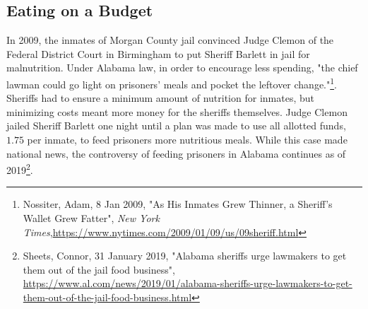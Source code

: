 \begin{comment}
Since acres are in thousands, divide the constraints of timber and animal grazing by 1000 in the problem setup, and compensate for this after obtaining a solution.

The problem can be written as follows:
\begin{align*}
\text{maximize } &\sum\limits_{i=1}^7 \sum\limits_{j=1}^3 p_{i,j}x_{i,j} \\
\text{subject to } &\sum\limits_{j=1}^3 x_{i,j} = s_i  \text{ for } i=1,..,7 \\
	        &\sum\limits_{i=1}^7 \sum\limits_{j=1}^3 t_{i,j}x_{i,j} \geq 40,000 \\
		&\sum\limits_{i=1}^7 \sum\limits_{j=1}^3 g_{i,j}x_{i,j} \geq 5 \\
		&\frac{1}{788} \sum\limits_{i=1}^7 \sum\limits_{j=1}^3 w_{i,j}x_{i,j} \geq 70 \\
		&x_{i,j} \geq 0 \text{ for } i=1,...,7  \text{ and } j=1,2,3
\end{align*}

\begin{problem}
Solve the allocation problem above.
Return the minimizing allocation vector of $x_{i,j}$'s and the maximum total net present value.
Remember to consider the following:
\begin{enumerate}
\item The allocation vector should be a (21,1) NumPy array.
\item Recall that the constraints of timber and animal grazing were divided by 1000.
To compensate, the maximum total net value will be equal to the primal objective of the appropriately minimized linear function multiplied by -1000.
\end{enumerate}
\end{problem}

\end{comment}

\subsection*{Eating on a Budget}

In 2009, the inmates of Morgan County jail convinced Judge Clemon of the Federal District Court in Birmingham to put Sheriff Barlett in jail for malnutrition.
Under Alabama law, in order to encourage less spending, "the chief lawman could go light on prisoners' meals and pocket the leftover change."\footnote[1]{Nossiter, Adam, 8 Jan 2009, "As His Inmates Grew Thinner, a Sheriff’s Wallet Grew Fatter", \emph{New York Times},\url{https://www.nytimes.com/2009/01/09/us/09sheriff.html}}.
Sheriffs had to ensure a minimum amount of nutrition for inmates, but minimizing costs meant more money for the sheriffs themselves.
Judge Clemon jailed Sheriff Barlett one night until a plan was made to use all allotted funds, $1.75$ per inmate, to feed prisoners more nutritious meals.
While this case made national news, the controversy of feeding prisoners in Alabama continues as of 2019\footnote[2]{Sheets, Connor, 31 January 2019, "Alabama sheriffs urge lawmakers to get them out of the jail food business", \url{https://www.al.com/news/2019/01/alabama-sheriffs-urge-lawmakers-to-get-them-out-of-the-jail-food-business.html}}.

